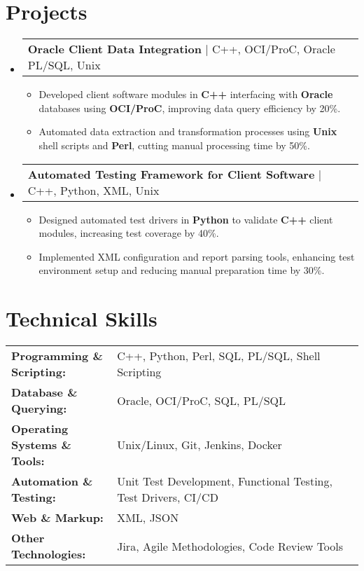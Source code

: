 \documentclass[letterpaper,11pt]{article}
\makeatletter
\newcommand{\resumeItem}[1]{
  \item\footnotesize{
    {#1 \vspace{-2pt}}
  }
}
\newcommand{\resumeProjectHeading}[2]{
    \item
    \begin{tabular*}{1.001\textwidth}{l@{\extracolsep{\fill}}r}
      \small#1 & \textbf{\small #2}\\
    \end{tabular*}\vspace{-7pt}
}
\newcommand{\resumeSubHeadingListStart}{\begin{itemize}[leftmargin=0pt, label={}]}
\newcommand{\resumeSubHeadingListEnd}{\end{itemize}}
\newcommand{\resumeItemListStart}{\begin{itemize}[leftmargin=*]}
\newcommand{\resumeItemListEnd}{\end{itemize}\vspace{-5pt}}
\makeatother
\begin{document}
\section{Projects}
    \vspace{-5pt}
    \resumeSubHeadingListStart
      \resumeProjectHeading
          {\textbf{Oracle Client Data Integration} | C++, OCI/ProC, Oracle PL/SQL, Unix}{}
          \resumeItemListStart
              \resumeItem{Developed client software modules in \textbf{C++} interfacing with \textbf{Oracle} databases using \textbf{OCI/ProC}, improving data query efficiency by 20\%.}
              \resumeItem{Automated data extraction and transformation processes using \textbf{Unix} shell scripts and \textbf{Perl}, cutting manual processing time by 50\%.}
          \resumeItemListEnd
          \vspace{-16pt}
      \resumeProjectHeading
          {\textbf{Automated Testing Framework for Client Software} | C++, Python, XML, Unix}{}
          \resumeItemListStart
              \resumeItem{Designed automated test drivers in \textbf{Python} to validate \textbf{C++} client modules, increasing test coverage by 40\%.}
              \resumeItem{Implemented XML configuration and report parsing tools, enhancing test environment setup and reducing manual preparation time by 30\%.}
          \resumeItemListEnd
          \vspace{-16pt}
    \resumeSubHeadingListEnd
\vspace{-10pt}
\section{Technical Skills}
        \vspace{-14pt}
        \begin{table}[h]
            \footnotesize
            \begin{tabular}{p{0.3\linewidth} p{0.7\linewidth}}
                \textbf{Programming \& Scripting:} & C++, Python, Perl, SQL, PL/SQL, Shell Scripting \\
                \textbf{Database \& Querying:} & Oracle, OCI/ProC, SQL, PL/SQL \\
                \textbf{Operating Systems \& Tools:} & Unix/Linux, Git, Jenkins, Docker \\
                \textbf{Automation \& Testing:} & Unit Test Development, Functional Testing, Test Drivers, CI/CD \\
                \textbf{Web \& Markup:} & XML, JSON \\
                \textbf{Other Technologies:} & Jira, Agile Methodologies, Code Review Tools \\
            \end{tabular}
        \end{table}
\end{document}
